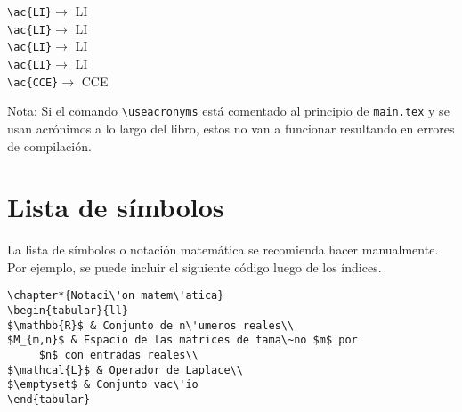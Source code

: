 \noindent \verb+\ac{LI}+$\rightarrow$ \ac{LI}\\
\verb+\ac{LI}+$\rightarrow$ \ac{LI}\\
\verb+\ac{LI}+$\rightarrow$ \ac{LI}\\
\verb+\ac{LI}+$\rightarrow$ \ac{LI}\\
\verb+\ac{CCE}+$\rightarrow$ \ac{CCE}

Nota: Si el comando \verb+\useacronyms+ est\'a comentado al principio de {\tt main.tex} y se
usan acr\'onimos a lo largo del libro, estos no van a funcionar resultando en errores de compilación.

\section{Lista de s\'imbolos}
La lista de s\'imbolos o notaci\'on matem\'atica se recomienda hacer manualmente. Por ejemplo, se puede incluir el siguiente c\'odigo luego de los \'indices.
\begin{verbatim}
\chapter*{Notaci\'on matem\'atica}
\begin{tabular}{ll}
$\mathbb{R}$ & Conjunto de n\'umeros reales\\
$M_{m,n}$ & Espacio de las matrices de tama\~no $m$ por 
     $n$ con entradas reales\\
$\mathcal{L}$ & Operador de Laplace\\
$\emptyset$ & Conjunto vac\'io
\end{tabular}
\end{verbatim}